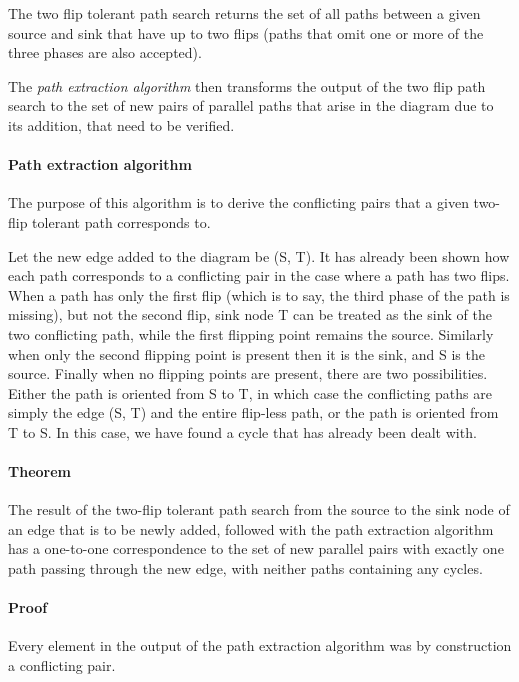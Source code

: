 \documentclass[sigplan,review,anonymous]{acmart}
\begin{document}
The two flip tolerant path search returns the set of all paths between a given source and sink that have up to two flips (paths that omit one or more of the three phases are also accepted).

The \textit{path extraction algorithm} then transforms the output of the two flip path search to the set of new pairs of parallel paths that arise in the diagram due to its addition, that need to be verified.

\paragraph{Path extraction algorithm}
The purpose of this algorithm is to derive the conflicting pairs that a given two-flip tolerant path corresponds to.

Let the new edge added to the diagram be (S, T).
It has already been shown how each path corresponds to a conflicting pair in the case where a path has two flips. When a path has only the first flip (which is to say, the third phase of the path is missing), but not the second flip, sink node T can be treated as the sink of the two conflicting path, while the first flipping point remains the source. Similarly when only the second flipping point is present then it is the sink, and S is the source. Finally when no flipping points are present, there are two possibilities. 
Either the path is oriented from S to T, in which case the conflicting paths are simply the edge (S, T) and the entire flip-less path, or the path is oriented from T to S. In this case, we have found a cycle that has already been dealt with.


\paragraph{Theorem} The result of the two-flip tolerant path search from the source to the sink node of an edge that is to be newly added, followed with the path extraction algorithm has a one-to-one correspondence to the set of new parallel pairs with exactly one path passing through the new edge, with neither paths containing any cycles.

\paragraph{Proof}

Every element in the output of the path extraction algorithm was by construction a conflicting pair.
\end{document}
